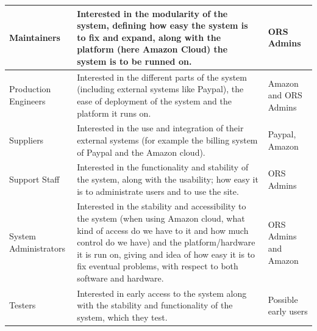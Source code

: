 \documentclass[a4paper,11pt]{report}
\begin{document}
\begin{center}
\begin{longtable}[H]{| l |  p{6cm} | p{2cm} |}
    \hline
    Maintainers & Interested in the modularity of the system, defining how easy
        the system is to fix and expand, along with the platform (here Amazon 
        Cloud) the system is to be runned on. & ORS Admins \\
    \hline
    Production Engineers & Interested in the different parts of the system 
        (including external systems like Paypal), the ease of deployment of the
        system and the platform it runs on. & Amazon and ORS Admins\\
    \hline
    Suppliers & Interested in the use and integration of their external systems
        (for example the billing system of Paypal and the Amazon cloud). 
        & Paypal, Amazon\\
    \hline
    Support Staff & Interested in the functionality and stability of the system,
        along with the usability; how easy it is to administrate users and to 
        use the site. & ORS Admins \\
    \hline
    System Administrators & Interested in the stability and accessibility to 
        the system (when using Amazon cloud, what kind of access do we have to 
        it and how much control do we have) and the platform/hardware it is run
        on, giving and idea of how easy it is to fix eventual problems, with 
        respect to both software and hardware. & ORS Admins and Amazon \\
    \hline
    Testers & Interested in early access to the system along with the stability
        and functionality of the system, which they test. 
        & Possible early users\\
    \hline
  \end{longtable}
\end{center}
\end{document}

